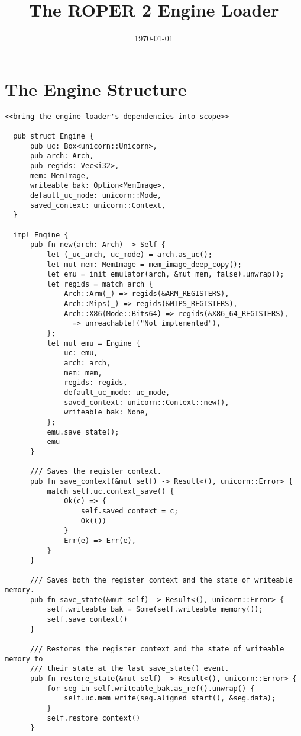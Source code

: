 \documentclass[11pt]{article}
\date{\today}
\title{The ROPER 2 Engine Loader}
\begin{document}
\maketitle
\tableofcontents



\section{The Engine Structure}
\label{sec:org7f60671}

\lstset{language=rust,label=org6e9e16b,caption= ,captionpos=b,numbers=none}
\begin{lstlisting}
<<bring the engine loader's dependencies into scope>>

  pub struct Engine {
      pub uc: Box<unicorn::Unicorn>,
      pub arch: Arch,
      pub regids: Vec<i32>,
      mem: MemImage,
      writeable_bak: Option<MemImage>,
      default_uc_mode: unicorn::Mode,
      saved_context: unicorn::Context,
  }

  impl Engine {
      pub fn new(arch: Arch) -> Self {
          let (_uc_arch, uc_mode) = arch.as_uc();
          let mut mem: MemImage = mem_image_deep_copy();
          let emu = init_emulator(arch, &mut mem, false).unwrap();
          let regids = match arch {
              Arch::Arm(_) => regids(&ARM_REGISTERS),
              Arch::Mips(_) => regids(&MIPS_REGISTERS),
              Arch::X86(Mode::Bits64) => regids(&X86_64_REGISTERS),
              _ => unreachable!("Not implemented"),
          };
          let mut emu = Engine {
              uc: emu,
              arch: arch,
              mem: mem,
              regids: regids,
              default_uc_mode: uc_mode,
              saved_context: unicorn::Context::new(),
              writeable_bak: None,
          };
          emu.save_state();
          emu
      }

      /// Saves the register context.
      pub fn save_context(&mut self) -> Result<(), unicorn::Error> {
          match self.uc.context_save() {
              Ok(c) => {
                  self.saved_context = c;
                  Ok(())
              }
              Err(e) => Err(e),
          }
      }

      /// Saves both the register context and the state of writeable memory.
      pub fn save_state(&mut self) -> Result<(), unicorn::Error> {
          self.writeable_bak = Some(self.writeable_memory());
          self.save_context()
      }

      /// Restores the register context and the state of writeable memory to
      /// their state at the last save_state() event.
      pub fn restore_state(&mut self) -> Result<(), unicorn::Error> {
          for seg in self.writeable_bak.as_ref().unwrap() {
              self.uc.mem_write(seg.aligned_start(), &seg.data);
          }
          self.restore_context()
      }


\end{lstlisting}
\end{document}
